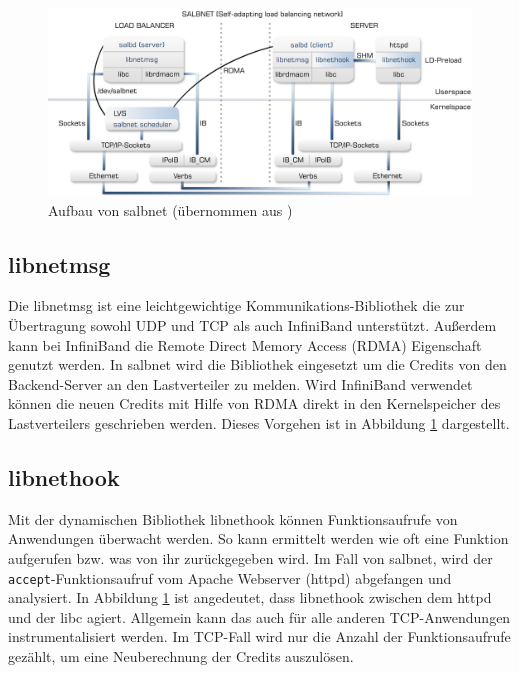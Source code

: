 \documentclass[a4paper, 12pt, BCOR10mm, DIV12, toc=bibliography, toc=listof, german]{scrbook}
\begin{document}
		\begin{figure}
			\centering
			\includegraphics[width=\textwidth]{images/salbnet.png}
			\caption{Aufbau von salbnet (übernommen aus \cite{zinke2012})}
			\label{fig:salbnet}
		\end{figure}

		\subsection*{libnetmsg} %

			Die libnetmsg \cite{rabweg2009} ist eine leichtgewichtige Kommunikations-Bibliothek die zur
			Übertragung sowohl UDP und TCP als auch InfiniBand unterstützt. Außerdem kann bei InfiniBand
			die Remote Direct Memory Access (RDMA) Eigenschaft genutzt werden. In salbnet wird die
			Bibliothek eingesetzt um die Credits von den Backend-Server an den Lastverteiler zu melden. Wird
			InfiniBand verwendet können die neuen Credits mit Hilfe von RDMA direkt in den Kernelspeicher
			des Lastverteilers geschrieben werden. Dieses Vorgehen ist in Abbildung \ref{fig:salbnet}
			dargestellt.

		
		\subsection*{libnethook} %

			Mit der dynamischen Bibliothek libnethook können Funktionsaufrufe von Anwendungen überwacht
			werden. So kann ermittelt werden wie oft eine Funktion aufgerufen bzw. was von ihr
			zurückgegeben wird. Im Fall von salbnet, wird der \texttt{accept}-Funktionsaufruf vom Apache
			Webserver (httpd) \cite{httpd} abgefangen und analysiert. In Abbildung \ref{fig:salbnet} ist
			angedeutet, dass libnethook zwischen dem httpd und der libc agiert. Allgemein kann das auch
			für alle anderen TCP-Anwendungen instrumentalisiert werden. Im TCP-Fall wird nur die Anzahl
			der Funktionsaufrufe gezählt, um eine Neuberechnung der Credits auszulösen.
\end{document}
